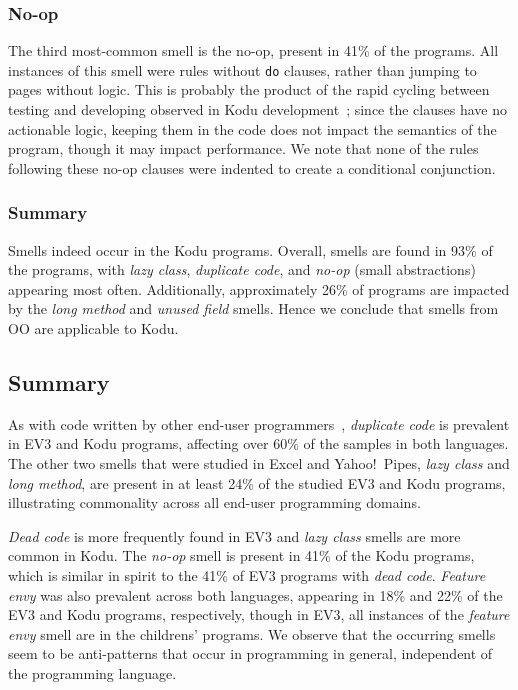 \documentclass[conference]{IEEEtran}
\begin{document}
\subsubsection{No-op}
The third most-common smell is the no-op, present in 41\% of the programs. All instances of this smell were rules without {\tt do} clauses, rather than jumping to pages without logic.  This is probably the product of the rapid cycling between testing and developing observed in Kodu development~\cite{Stolee:2011:ECS:1953163.1953197}; since the clauses have no actionable logic, keeping them in the code does not impact the semantics of the program, though it may impact performance. We note that none of the rules following these no-op clauses were indented to create a conditional conjunction. 


\subsubsection{Summary}
Smells indeed occur in the Kodu programs. Overall, smells are found in 93\% of the programs, with \emph{lazy class}, \emph{duplicate code},  and \emph{no-op} (small abstractions) appearing most often. Additionally, approximately 26\% of programs are impacted by the \emph{long method} and \emph{unused field} smells. Hence we conclude that smells from OO are applicable to Kodu. 

\subsection{Summary}


As with code written by other end-user programmers~\cite{StoleeTSE2013}, \emph{duplicate code} is prevalent in EV3 and Kodu programs, affecting over 60\% of the samples in both languages. The other two smells that were studied in Excel and Yahoo!\ Pipes, \emph{lazy class} and \emph{long method}, are present in at least 24\% of the studied EV3 and Kodu programs, illustrating commonality across all end-user programming domains. 

\emph{Dead code} is more frequently found in EV3 and \emph{lazy class} smells are more common in Kodu. The \emph{no-op} smell is present in 41\% of the Kodu programs, which is similar in spirit to the 41\% of EV3 programs with \emph{dead code}. \emph{Feature envy} was also prevalent across both languages, appearing in 18\% and 22\% of the EV3 and Kodu programs, respectively, though in EV3, all instances of the \emph{feature envy} smell are in the childrens' programs. 
We observe that the occurring smells seem to be anti-patterns that occur in programming in general, independent of the programming language. 
\end{document}
